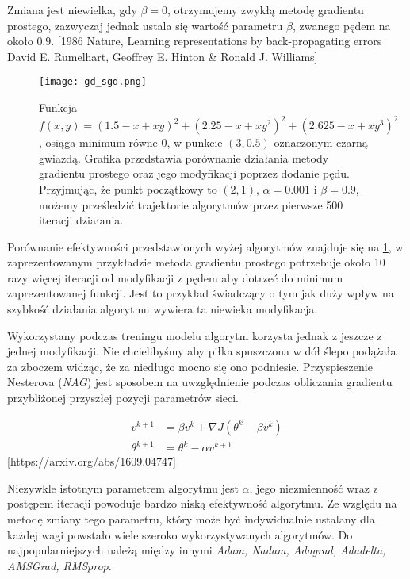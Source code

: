 \documentclass[11pt]{book}
\theoremstyle{definition}
\begin{document}
Zmiana jest niewielka, gdy $\beta = 0$, otrzymujemy zwykłą metodę gradientu prostego, zazwyczaj jednak ustala się wartość parametru $\beta$, zwanego pędem na około $0.9$. [1986 Nature, Learning representations by back-propagating errors
David E. Rumelhart, Geoffrey E. Hinton \& Ronald J. Williams] 

\begin{figure}[h	]
	\centering
	\texttt{[image: gd\_sgd.png]}
	\caption{Funkcja  $f(x,y) =(1.5 - x + xy)^2 + (2.25 - x + xy^2)^2 + (2.625 - x + xy^3)^2$, osiąga minimum równe 0, w punkcie $(3,0.5)$ oznaczonym  czarną gwiazdą. Grafika przedstawia porównanie działania metody gradientu prostego oraz jego modyfikacji poprzez dodanie pędu. Przyjmując, że punkt początkowy to $(2,1)$, $\alpha = 0.001$ i $\beta = 0.9$, możemy prześledzić trajektorie algorytmów przez pierwsze 500 iteracji działania.} 
	\label{fig:gd_sgd}
\end{figure}

Porównanie efektywności przedstawionych wyżej algorytmów znajduje się na \figurename{} \ref{fig:gd_sgd}, w zaprezentowanym przykładzie metoda gradientu prostego potrzebuje około 10 razy więcej iteracji od modyfikacji z pędem aby dotrzeć do minimum zaprezentowanej funkcji. Jest to przykład świadczący o tym jak duży wpływ na szybkość działania algorytmu wywiera ta niewieka modyfikacja. 


Wykorzystany podczas treningu modelu algorytm korzysta jednak z jeszcze z jednej modyfikacji. Nie chcielibyśmy aby piłka spuszczona w dół ślepo podążała za zboczem widząc, że za niedługo mocno się ono podniesie. Przyspieszenie Nesterova (\textit{NAG}) jest sposobem na uwzględnienie podczas obliczania gradientu przybliżonej przyszłej pozycji parametrów sieci.	

\begin{align} 
v^{k+1} &=  \beta v^{k}+ \nabla J(\theta^{k} - \beta v^{k}) \\[0.4em]
\theta^{k+1} &=  \theta^{k }- \alpha v^{k+1}
\end{align}
[https://arxiv.org/abs/1609.04747]


Niezywkle istotnym parametrem algorytmu jest $\alpha$, jego niezmienność wraz z postępem iteracji powoduje bardzo niską efektywność algorytmu. Ze względu na metodę zmiany tego parametru, który może być indywidualnie ustalany dla każdej wagi powstało wiele szeroko wykorzystywanych algorytmów. Do najpopularniejszych należą między innymi \textit{Adam, Nadam, Adagrad, Adadelta, AMSGrad, RMSprop}. 
\end{document}
